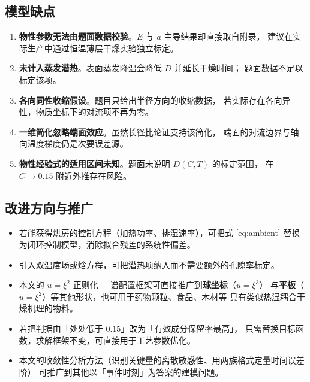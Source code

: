\documentclass[bwprint]{cumcmthesis}
\begin{document}
\subsection{模型缺点}

\begin{enumerate}[leftmargin=1.9em,itemsep=2pt]
\item \textbf{物性参数无法由题面数据校验}。$E$ 与 $a$ 主导结果却直接取自附录，
建议在实际生产中通过恒温薄层干燥实验独立标定。
\item \textbf{未计入蒸发潜热}。表面蒸发降温会降低 $D$ 并延长干燥时间；
题面数据不足以标定该项。
\item \textbf{各向同性收缩假设}。题目只给出半径方向的收缩数据，
若实际存在各向异性，物质坐标下的对流项不再为零。
\item \textbf{一维简化忽略端面效应}。虽然长径比论证支持该简化，
端面的对流边界与轴向温度梯度仍是次要误差源。
\item \textbf{物性经验式的适用区间未知}。题面未说明 $D(C,T)$ 的标定范围，
在 $C\to0.15$ 附近外推存在风险。
\end{enumerate}

\subsection{改进方向与推广}

\begin{itemize}[leftmargin=1.7em,itemsep=2pt]
\item 若能获得烘房的控制方程（加热功率、排湿速率），可把式 \eqref{eq:ambient}
替换为闭环控制模型，消除拟合残差的系统性偏差。
\item 引入双温度场或焓方程，可把潜热项纳入而不需要额外的孔隙率标定。
\item 本文的 $u=\xi^2$ 正则化 $+$ 谱配置框架可直接推广到\textbf{球坐标}（$u=\xi^3$）
与\textbf{平板}（$u=\xi^2$）等其他形状，也可用于药物颗粒、食品、木材等
具有类似热湿耦合干燥机理的物料。
\item 若把判据由「处处低于 $0.15$」改为「有效成分保留率最高」，
只需替换目标函数，求解框架不变，可直接用于工艺参数优化。
\item 本文的收敛性分析方法（识别关键量的离散敏感性、用两族格式定量时间误差阶）
可推广到其他以「事件时刻」为答案的建模问题。
\end{itemize}
\end{document}

